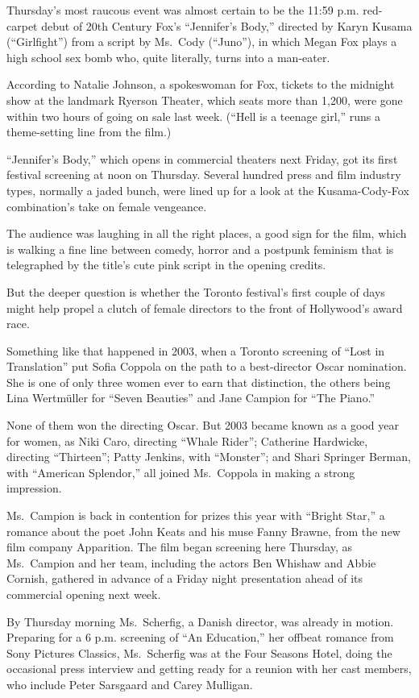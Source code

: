 ﻿\documentclass[12pt]{article}
\begin{document}
Thursday's most raucous event was almost certain to be the 11:59 p.m. red-carpet debut of 20th
Century Fox's ``Jennifer's Body,'' directed by Karyn Kusama (``Girlfight'') from a script by
Ms.~Cody (``Juno''), in which Megan Fox plays a high school sex bomb who, quite literally, turns
into a man-eater.

According to Natalie Johnson, a spokeswoman for Fox, tickets to the midnight show at the landmark
Ryerson Theater, which seats more than 1,200, were gone within two hours of going on sale last week.
(``Hell is a teenage girl,'' runs a theme-setting line from the film.)

``Jennifer's Body,'' which opens in commercial theaters next Friday, got its first festival
screening at noon on Thursday. Several hundred press and film industry types, normally a jaded
bunch, were lined up for a look at the Kusama-Cody-Fox combination's take on female vengeance.

The audience was laughing in all the right places, a good sign for the film, which is walking a fine
line between comedy, horror and a postpunk feminism that is telegraphed by the title's cute pink
script in the opening credits.

But the deeper question is whether the Toronto festival's first couple of days might help propel a
clutch of female directors to the front of Hollywood's award race.

Something like that happened in 2003, when a Toronto screening of ``Lost in Translation'' put Sofia
Coppola on the path to a best-director Oscar nomination. She is one of only three women ever to earn
that distinction, the others being Lina Wertmüller for ``Seven Beauties'' and Jane Campion for ``The
Piano.''

None of them won the directing Oscar. But 2003 became known as a good year for women, as Niki Caro,
directing ``Whale Rider''; Catherine Hardwicke, directing ``Thirteen''; Patty Jenkins, with
``Monster''; and Shari Springer Berman, with ``American Splendor,'' all joined Ms.~Coppola in making
a strong impression.

Ms.~Campion is back in contention for prizes this year with ``Bright Star,'' a romance about the
poet John Keats and his muse Fanny Brawne, from the new film company Apparition. The film began
screening here Thursday, as Ms.~Campion and her team, including the actors Ben Whishaw and Abbie
Cornish, gathered in advance of a Friday night presentation ahead of its commercial opening next
week.

By Thursday morning Ms.~Scherfig, a Danish director, was already in motion. Preparing for a 6 p.m.
screening of ``An Education,'' her offbeat romance from Sony Pictures Classics, Ms.~Scherfig was at
the Four Seasons Hotel, doing the occasional press interview and getting ready for a reunion with
her cast members, who include Peter Sarsgaard and Carey Mulligan.
\end{document}
